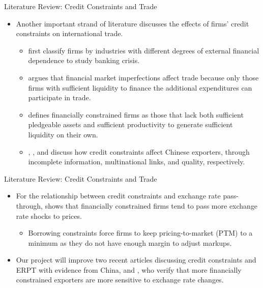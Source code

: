 \documentclass[10pt]{beamer}
\begin{document}
\begin{frame}{Literature Review: Credit Constraints and Trade}
	\begin{itemize}
		\item Another important strand of literature discusses the effects of firms’ credit constraints on international trade.
		\begin{itemize}
			\item \cite{kroszner2007} first classify firms by industries with different degrees of external financial dependence to study banking crisis.
			\item \cite{manova2013} argues
			that financial market imperfections affect trade because only those firms with sufficient liquidity to finance the additional expenditures can participate in trade.
			\item \cite{chaney2016} defines financially constrained firms as those that lack both sufficient pledgeable assets and sufficient productivity to generate sufficient liquidity on their own.
			\item \cite{feenstra2015}, \cite{manova-wei-zhang2015}, and \cite{fan-lai-li2015} discuss how credit constraints affect Chinese exporters, through incomplete information, multinational links, and quality, respectively.
		\end{itemize}	
	\end{itemize}
\end{frame}

\begin{frame}{Literature Review: Credit Constraints and Trade}
	\begin{itemize}
		\item For the relationship between credit constraints and exchange rate pass-through, \cite{strasser2013} shows that financially constrained firms tend to pass more exchange rate shocks to prices.
		\begin{itemize}
			\item Borrowing constraints force firms to keep pricing-to-market (PTM) to a
			minimum as they do not have enough margin to adjust markups.
		\end{itemize}
		\item Our project will improve two recent articles discussing credit constraints and ERPT with evidence from China, \cite{dai2021} and \cite{xu-guo2021}, who verify that more financially constrained exporters are more sensitive to exchange rate changes.
	\end{itemize}	
\end{frame}
\end{document}
